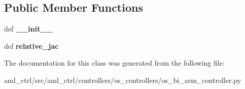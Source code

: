 \subsection*{Public Member Functions}
\begin{DoxyCompactItemize}
\item 
\hypertarget{classaml__ctrl_1_1controllers_1_1os__controllers_1_1os__bi__arm__controller_1_1_o_s_bi_arm_controller_a9800c28c617d6748e1e1b78ee3ccc549}{def {\bfseries \-\_\-\-\_\-init\-\_\-\-\_\-}}\label{classaml__ctrl_1_1controllers_1_1os__controllers_1_1os__bi__arm__controller_1_1_o_s_bi_arm_controller_a9800c28c617d6748e1e1b78ee3ccc549}

\item 
\hypertarget{classaml__ctrl_1_1controllers_1_1os__controllers_1_1os__bi__arm__controller_1_1_o_s_bi_arm_controller_ac3e3ec1e8bcf59e02f632ed5ae5ea048}{def {\bfseries relative\-\_\-jac}}\label{classaml__ctrl_1_1controllers_1_1os__controllers_1_1os__bi__arm__controller_1_1_o_s_bi_arm_controller_ac3e3ec1e8bcf59e02f632ed5ae5ea048}

\end{DoxyCompactItemize}


The documentation for this class was generated from the following file\-:\begin{DoxyCompactItemize}
\item 
aml\-\_\-ctrl/src/aml\-\_\-ctrl/controllers/os\-\_\-controllers/os\-\_\-bi\-\_\-arm\-\_\-controller.\-py\end{DoxyCompactItemize}
